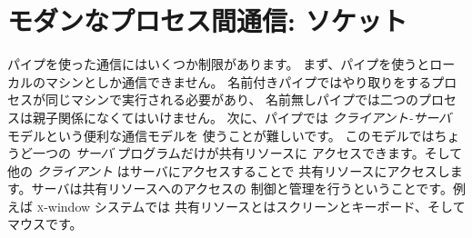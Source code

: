 %
%

\chapter{\label{sec/sockets}モダンなプロセス間通信: ソケット}

パイプを使った通信にはいくつか制限があります。
まず、パイプを使うとローカルのマシンとしか通信できません。
名前付きパイプではやり取りをするプロセスが同じマシンで実行される必要があり、
名前無しパイプでは二つのプロセスは親子関係になくてはいけません。
次に、パイプでは \emph{クライアント-サーバ} モデルという便利な通信モデルを
使うことが難しいです。
このモデルではちょうど一つの \emph{サーバ} プログラムだけが共有リソースに
アクセスできます。そして他の \emph{クライアント} はサーバにアクセスすることで
共有リソースにアクセスします。サーバは共有リソースへのアクセスの
制御と管理を行うということです。例えば \textsc{x}-window システムでは
共有リソースとはスクリーンとキーボード、そしてマウスです。

